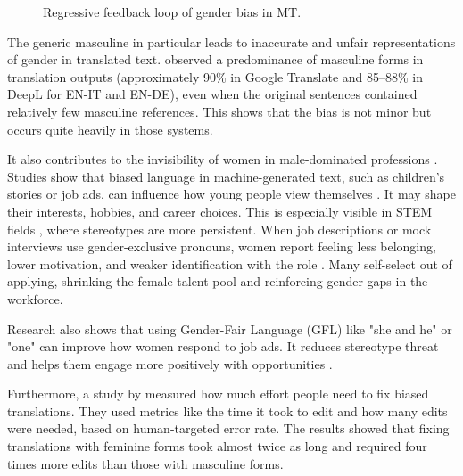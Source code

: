         \vspace{0.8em} 
        \begin{figure}[htb]
            \centering
            \scalebox{0.8}{}
            \caption{Regressive feedback loop of gender bias in MT.}
            \label{fig:regressive_feedback_loop}
        \end{figure}
        \vspace{0.8em} 

        The generic masculine in particular leads to inaccurate and unfair representations of gender in translated text. \textcite{rescignoGenderBiasMachine2023} observed a predominance of masculine forms in translation outputs (approximately 90\% in Google Translate and 85–88\% in DeepL for EN-IT and EN-DE), even when the original sentences contained relatively few masculine references. This shows that the bias is not minor but occurs quite heavily in those systems.

        It also contributes to the invisibility of women in male-dominated professions \parencite{kapplAreAllSpanish2025}. Studies show that biased language in machine-generated text, such as children’s stories or job ads, can influence how young people view themselves \parencite{soundararajanInvestigatingGenderBias2024,kapplAreAllSpanish2025}. It may shape their interests, hobbies, and career choices. This is especially visible in STEM fields \parencite{pratesAssessingGenderBias2019}, where stereotypes are more persistent. When job descriptions or mock interviews use gender-exclusive pronouns, women report feeling less belonging, lower motivation, and weaker identification with the role \parencite{godsilEffectsGenderRoles2016}. Many self-select out of applying, shrinking the female talent pool and reinforcing gender gaps in the workforce.

        Research also shows that using Gender-Fair Language (GFL) like "she and he" or "one" can improve how women respond to job ads. It reduces stereotype threat and helps them engage more positively with opportunities \parencite{godsilEffectsGenderRoles2016}.

        Furthermore, a study by \textcite{savoldiWhatHarmQuantifying2024} measured how much effort people need to fix biased translations. They used metrics like the time it took to edit and how many edits were needed, based on human-targeted error rate. The results showed that fixing translations with feminine forms took almost twice as long and required four times more edits than those with masculine forms.

